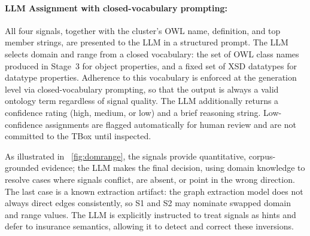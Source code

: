 \documentclass[sigconf]{acmart}
\begin{document}




\paragraph{\textbf{LLM Assignment with closed-vocabulary prompting: }} All four signals, together with the cluster's OWL name, definition, and top member strings, are presented to the LLM in a structured prompt. The LLM selects domain and range from a closed vocabulary: the set of OWL class names produced in Stage~3 for object properties, and a fixed set of XSD datatypes for datatype properties. Adherence to this vocabulary is enforced at the generation level via closed-vocabulary prompting, so that the output is always a valid ontology term regardless of signal quality. The LLM additionally returns a confidence rating (high, medium, or low) and a brief reasoning string. Low-confidence assignments are flagged automatically for human review and are not committed to the TBox until inspected.

As illustrated in ~\autoref{fig:domrange}, the signals provide quantitative, corpus-grounded evidence; the LLM makes the final decision, using domain knowledge to resolve cases where signals conflict, are absent, or point in the wrong direction. The last case is a known extraction artifact: the graph extraction model does not always direct edges consistently, so S1 and S2 may nominate swapped domain and range values. The LLM is explicitly instructed to treat signals as hints and defer to insurance semantics, allowing it to detect and correct these inversions.
\end{document}
